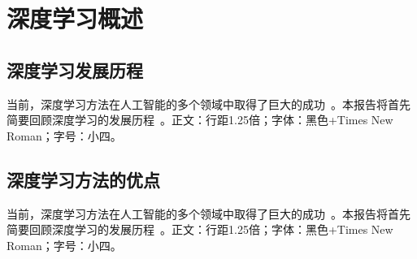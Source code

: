 \documentclass[a4paper, AutoFakeBold]{article}
\title{\mytitle}
\author{xxx}
\date{\today}
\begin{document}
\maketitle

\setcounter{page}{1}
\begin{abstract}
这是一段摘要，用来占位。这是一段摘要，用来占位。这是一段摘要，用来占位。这是一段摘要，用来占位。这是一段摘要，用来占位。这是一段摘要，用来占位。这是一段摘要，用来占位。这是一段摘要，用来占位。这是一段摘要，用来占位。这是一段摘要，用来占位。这是一段摘要，用来占位。这是一段摘要，用来占位。这是一段摘要，用来占位。这是一段摘要，用来占位。这是一段摘要，用来占位。这是一段摘要，用来占位。这是一段摘要，用来占位。这是一段摘要，用来占位。这是一段摘要，用来占位。这是一段摘要，用来占位。这是一段摘要，用来占位。这是一段摘要，用来占位。这是一段摘要，用来占位。这是一段摘要，用来占位。这是一段摘要，用来占位。这是一段摘要，用来占位。这是一段摘要，用来占位。这是一段摘要，用来占位。这是一段摘要，用来占位。这是一段摘要，用来占位。这是一段摘要，用来占位。这是一段摘要，用来占位。这是一段摘要，用来占位。这是一段摘要，用来占位。这是一段摘要，用来占位。这是一段摘要，用来占位。这是一段摘要，用来占位。这是一段摘要，用来占位。这是一段摘要，用来占位。这是一段摘要，用来占位。这是一段摘要，用来占位。这是一段摘要，用来占位。这是一段摘要，用来占位。这是一段摘要，用来占位。这是一段摘要，用来占位。这是一段摘要，用来占位。这是一段摘要，用来占位。这是一段摘要，用来占位。这是一段摘要，用来占位。这是一段摘要，用来占位。这是一段摘要，用来占位。这是一段摘要，用来占位。这是一段摘要，用来占位。这是一段摘要，用来占位。
\end{abstract}
\section{深度学习概述}
\subsection{深度学习发展历程}
当前，深度学习方法在人工智能的多个领域中取得了巨大的成功~\cite{defferrard2016convolutional}。本报告将首先简要回顾深度学习的发展历程~\cite{hechtlinger2017generalization}。正文：行距1.25倍；字体：黑色+Times New Roman；字号：小四。
\subsection{深度学习方法的优点}
当前，深度学习方法在人工智能的多个领域中取得了巨大的成功~\cite{huang2017densely}。本报告将首先简要回顾深度学习的发展历程~\cite{marzano2007rainfall}。正文：行距1.25倍；字体：黑色+Times New Roman；字号：小四。
\end{document}
